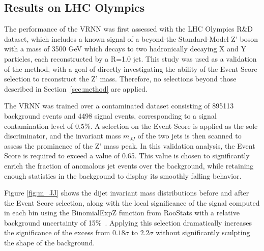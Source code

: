 \documentclass[letterpaper,11pt]{article}
\begin{document}
\subsection{Results on LHC Olympics}
\label{sec:results}


\hspace{\parindent}The performance of the VRNN was first assessed with the LHC Olympics R\&D dataset, which includes a known signal of a beyond-the-Standard-Model Z' boson with a mass of 3500 GeV which decays to two hadronically decaying X and Y particles, each reconstructed by a R=1.0 jet.
This study was used as a validation of the method, with a goal of directly investigating the ability of the Event Score selection to reconstruct the Z' mass. 
Therefore, no selections beyond those described in Section~\ref{sec:method} are applied.


The VRNN was trained over a contaminated dataset consisting of 895113 background events and 4498 signal events, corresponding to a signal contamination level of 0.5\%.
A selection on the Event Score is applied as the sole discriminator, and the invariant mass $m_{JJ}$ of the two jets is then scanned to assess the prominence of the Z' mass peak.
In this validation analysis, the Event Score is required to exceed a value of 0.65. 
This value is chosen to significantly enrich the fraction of anomalous jet events over the background, while retaining enough statistics in the background to display its smoothly falling behavior.

Figure \ref{fig:m_JJ} shows the dijet invariant mass distributions before and after the Event Score selection, along with the local significance of the signal computed in each bin using the {\sc BinomialExpZ} function from {\sc RooStats} with a relative background uncertainty of 15\%~\cite{moneta2011roostats}.
Applying this selection dramatically increases the significance of the excess from $0.18\sigma$ to $2.2\sigma$ without significantly sculpting the shape of the background.
\end{document}
